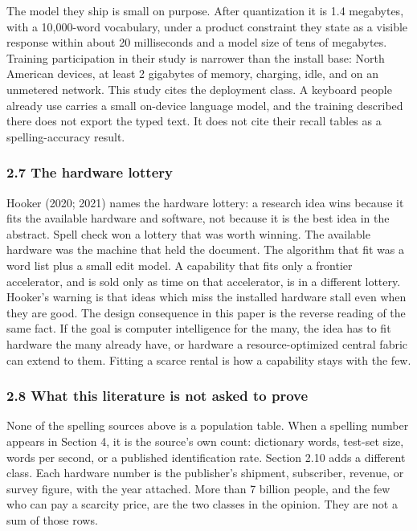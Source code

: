 \documentclass[
  10pt,
]{article}
\begin{document}
The model they ship is small on purpose. After quantization it is 1.4
megabytes, with a 10,000-word vocabulary, under a product constraint
they state as a visible response within about 20 milliseconds and a
model size of tens of megabytes. Training participation in their study
is narrower than the install base: North American devices, at least 2
gigabytes of memory, charging, idle, and on an unmetered network. This
study cites the deployment class. A keyboard people already use carries
a small on-device language model, and the training described there does
not export the typed text. It does not cite their recall tables as a
spelling-accuracy result.

\subsubsection{2.7 The hardware lottery}\label{the-hardware-lottery}

Hooker (2020; 2021) names the hardware lottery: a research idea wins
because it fits the available hardware and software, not because it is
the best idea in the abstract. Spell check won a lottery that was worth
winning. The available hardware was the machine that held the document.
The algorithm that fit was a word list plus a small edit model. A
capability that fits only a frontier accelerator, and is sold only as
time on that accelerator, is in a different lottery. Hooker's warning is
that ideas which miss the installed hardware stall even when they are
good. The design consequence in this paper is the reverse reading of the
same fact. If the goal is computer intelligence for the many, the idea
has to fit hardware the many already have, or hardware a
resource-optimized central fabric can extend to them. Fitting a scarce
rental is how a capability stays with the few.

\subsubsection{2.8 What this literature is not asked to
prove}\label{what-this-literature-is-not-asked-to-prove}

None of the spelling sources above is a population table. When a
spelling number appears in Section 4, it is the source's own count:
dictionary words, test-set size, words per second, or a published
identification rate. Section 2.10 adds a different class. Each hardware
number is the publisher's shipment, subscriber, revenue, or survey
figure, with the year attached. More than 7 billion people, and the few
who can pay a scarcity price, are the two classes in the opinion. They
are not a sum of those rows.
\end{document}

